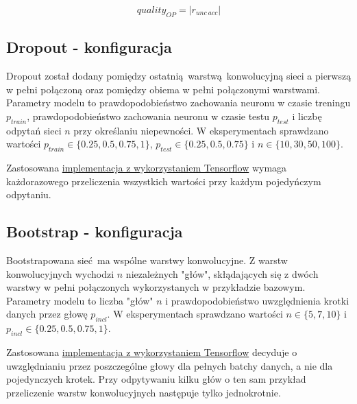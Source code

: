 \[ quality_{OP} = |r_{unc\ acc}|\]

\subsection{Dropout - konfiguracja}
Dropout został dodany pomiędzy ostatnią warstwą konwolucyjną sieci a pierwszą w pełni połączoną oraz pomiędzy obiema w pełni połączonymi warstwami.
Parametry modelu to prawdopodobieństwo zachowania neuronu w czasie treningu $p_{train}$, prawdopodobieństwo zachowania neuronu w czasie testu $p_{test}$ i liczbę odpytań sieci $n$ przy określaniu niepewności. W eksperymentach sprawdzano wartości $p_{train} \in \{0.25, 0.5, 0.75, 1\}$, $p_{test} \in \{0.25, 0.5, 0.75\}$ i $n \in \{10, 30, 50, 100\}$.

Zastosowana \href{https://link.do.pliku}{implementacja z wykorzystaniem Tensorflow} wymaga każdorazowego przeliczenia wszystkich wartości przy każdym pojedyńczym odpytaniu.

\subsection{Bootstrap - konfiguracja}
Bootstrapowana sieć ma wspólne warstwy konwolucyjne. Z warstw konwolucyjnych wychodzi $n$ niezależnych "głów", skłądających się z dwóch warstwy w pełni połączonych wykorzystanych w przykładzie bazowym. Parametry modelu to liczba "głów" $n$ i prawdopodobieństwo uwzględnienia krotki danych przez głowę $p_{incl}$.  W eksperymentach sprawdzano wartości $n \in  \{5,7,10\}$ i $p_{incl}\in\{0.25, 0.5, 0.75, 1\}$.

Zastosowana \href{https://link.do.pliku}{implementacja z wykorzystaniem Tensorflow} decyduje o uwzględnianiu przez poszczególne głowy dla pełnych batchy danych, a nie dla pojedynczych krotek. Przy odpytywaniu kilku głów o ten sam przykład przeliczenie warstw konwolucyjnych następuje tylko jednokrotnie.


